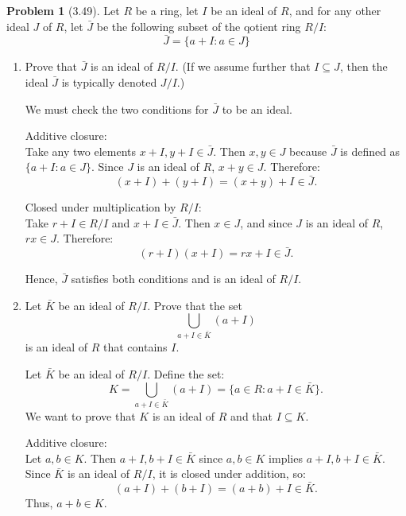 \documentclass[12pt]{article}
\theoremstyle{definition}
\newtheorem{problem}{Problem}
\begin{document}
\begin{problem}[3.49]
    Let $R$ be a ring, let $I$ be an ideal of $R$, and for any other ideal $J$ of $R$, let $\bar{J}$ be the following
    subset of the qotient ring $R/I$:
    \[
        \bar{J} = \{a + I : a \in J\}
    \]
    \begin{enumerate}[label=(\alph*)]
        \item Prove that $\bar{J}$ is an ideal of $R/I$. (If we assume further that $I \subseteq J$, then the ideal
                $\bar{J}$ is typically denoted $J/I$.)
                
                \begin{solution}
                    We must check the two conditions for $\bar{J}$ to be an ideal.

                    Additive closure:\\
                    Take any two elements $x + I, y + I \in \bar{J}$. Then $x, y \in J$ because $\bar{J}$ is defined as $\{a + I : a \in J\}$. Since $J$ is an ideal of $R$, $x + y \in J$. Therefore:
                    \[
                    (x + I) + (y + I) = (x + y) + I \in \bar{J}.
                    \]
                    
                    Closed under multiplication by $R/I$:\\
                    Take $r + I \in R/I$ and $x + I \in \bar{J}$. Then $x \in J$, and since $J$ is an ideal of $R$, $rx \in J$. Therefore:
                    \[
                    (r + I)(x + I) = rx + I \in \bar{J}.
                    \]
                    
                    Hence, $\bar{J}$ satisfies both conditions and is an ideal of $R/I$.                    
                \end{solution}
        \item Let $\bar{K}$ be an ideal of $R/I$. Prove that the set
                \[
                    \bigcup_{a + I \in \bar{K}} (a + I)
                \]
                is an ideal of $R$ that contains $I$.

                \begin{solution}
                    Let $\bar{K}$ be an ideal of $R/I$. Define the set:
                    \[
                    K = \bigcup_{a + I \in \bar{K}} (a + I) = \{a \in R : a + I \in \bar{K}\}.
                    \]
                    We want to prove that $K$ is an ideal of $R$ and that $I \subseteq K$.
                    
                    Additive closure:\\
                    Let $a, b \in K$. Then $a + I, b + I \in \bar{K}$ since $a, b \in K$ implies $a + I, b + I \in \bar{K}$. Since $\bar{K}$ is an ideal of $R/I$, it is closed under addition, so:
                    \[
                    (a + I) + (b + I) = (a + b) + I \in \bar{K}.
                    \]
                    Thus, $a + b \in K$.
                    

\end{solution}
\end{enumerate}
\end{problem}
\end{document}
